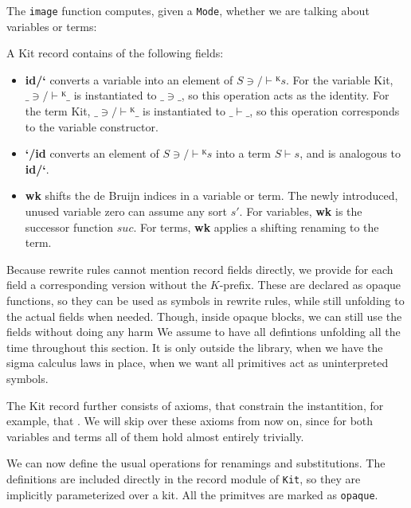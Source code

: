 \documentclass[screen,nonacm]{acmart}
\begin{document}
The \texttt{image} function computes, given a \texttt{Mode}, whether we are
talking about variables or terms: \AImage

A Kit record contains of the following fields:
\begin{itemize}
      \item \textbf{id/‘} converts a variable into an element of \(S ∋/⊢ᴷ s\).
            For the variable Kit, $\_∋/⊢ᴷ\_$ is instantiated to \(\_\ni\_\), so this operation acts as the identity.
            For the term Kit, $\_∋/⊢ᴷ\_$ is instantiated to \(\_⊢\_\), so this operation corresponds to the variable constructor.
      \item \textbf{‘/id} converts an element of \(S ∋/⊢ᴷ s\) into a term \(S ⊢ s\), and is analogous to \textbf{id/‘}.
      \item \textbf{wk} shifts the de Bruijn indices in a variable or term.
            The newly introduced, unused variable \(\text{zero}\) can assume any sort \(s'\).
            For variables, \textbf{wk} is the successor function \(suc\).
            For terms, \textbf{wk} applies a shifting renaming to the term.
\end{itemize}
Because rewrite rules cannot mention record fields directly, we provide for each field a
corresponding version without the $K$-prefix. These are declared as opaque functions, so
they can be used as symbols in rewrite rules, while still unfolding to the actual fields
when needed. Though, inside opaque blocks, we can still use the fields without doing any harm
We assume to have all defintions unfolding all the time throughout this section.
It is only outside the library, when we have the sigma calculus laws in place, when we want all primitives act as uninterpreted symbols.

The Kit record further consists of axioms, that constrain the instantition, for
example, that \AAxiomEx. We will skip over these axioms from now on, since for
both variables and terms all of them hold almost entirely trivially.

We can now define the usual operations for renamings and substitutions. The
definitions are included directly in the record module of \texttt{Kit}, so they
are implicitly parameterized over a kit. All the primitves are marked as
\texttt{opaque}.
\begin{minipage}[t]{0.48\linewidth}
      \raggedright{}
      \AMapA{}
\end{minipage}
\begin{minipage}[t]{0.48\linewidth}
      \raggedright{}
      \AMapB{}
\end{minipage}
\end{document}
